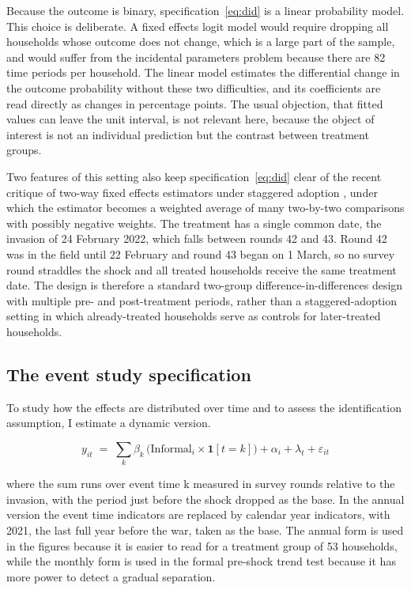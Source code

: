 Because the outcome is binary, specification~\eqref{eq:did} is a linear probability model. This choice is deliberate. A fixed effects logit model would require dropping all households whose outcome does not change, which is a large part of the sample, and would suffer from the incidental parameters problem because there are 82 time periods per household. The linear model estimates the differential change in the outcome probability without these two difficulties, and its coefficients are read directly as changes in percentage points. The usual objection, that fitted values can leave the unit interval, is not relevant here, because the object of interest is not an individual prediction but the contrast between treatment groups.

Two features of this setting also keep specification~\eqref{eq:did} clear of the recent critique of two-way fixed effects estimators under staggered adoption \parencite{goodmanbacon2021,dechaisemartin2020,callaway2021,sun2021}, under which the estimator becomes a weighted average of many two-by-two comparisons with possibly negative weights. The treatment has a single common date, the invasion of 24 February 2022, which falls between rounds 42 and 43. Round 42 was in the field until 22 February and round 43 began on 1 March, so no survey round straddles the shock and all treated households receive the same treatment date. The design is therefore a standard two-group difference-in-differences design with multiple pre- and post-treatment periods, rather than a staggered-adoption setting in which already-treated households serve as controls for later-treated households.

\subsection{The event study specification}\label{sec:6-4}

To study how the effects are distributed over time and to assess the identification assumption, I estimate a dynamic version.

\begin{equation}\label{eq:event}
y_{it} \;=\; \sum_{k} \beta_{k} \,\bigl(\mathrm{Informal}_{i} \times \mathbf{1}[t=k]\bigr) + \alpha_{i} + \lambda_{t} + \varepsilon_{it}
\end{equation}

where the sum runs over event time k measured in survey rounds relative to the invasion, with the period just before the shock dropped as the base. In the annual version the event time indicators are replaced by calendar year indicators, with 2021, the last full year before the war, taken as the base. The annual form is used in the figures because it is easier to read for a treatment group of 53 households, while the monthly form is used in the formal pre-shock trend test because it has more power to detect a gradual separation.


